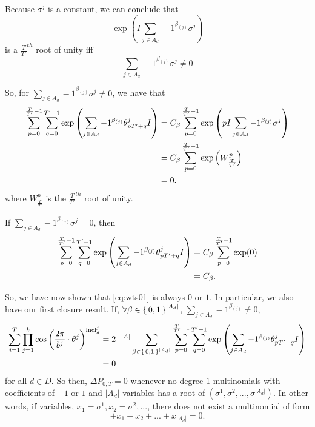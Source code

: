 \documentclass[11pt,titlepage]{article}
\newcommand{\rationalPeriodTotal}{{T}'}
\newcommand{\seedAngle}[1]{{\theta^j_{#1}}}
\newcommand{\totalPeriod}{T}
\newcommand{\inclIndic}[2]{{\mathrm{incl}_{#1}^{#2}}}
\newcommand{\numbToAngle}{\frac{2\pi}{b^j}}
\newcommand{\combSingleTerm}[1]{\prod_{j=1}^k \cos\left(\numbToAngle \cdot \theta^j\right) ^ {\inclIndic{#1}{j}}}
\newcommand{\digSumPeriodic}{\sigma^j}
\newcommand{\digSumPeriodicNoJ}{{\sigma}}
\newcommand{\totalOverRationalFrac}{\frac{\totalPeriod}{\rationalPeriodTotal}}
\begin{document}
Because $\digSumPeriodic$ is a constant, we can conclude that
\begin{equation*}
 \exp\left(
      I \sum_{j \in A_d} -1 ^ {\beta_{(j)}}
      \digSumPeriodic
    \right) 
\end{equation*}
is a $\totalOverRationalFrac^{th}$ root of unity iff 
$$\sum_{j \in A_d} -1 ^ {\beta_{(j)}}\digSumPeriodic \neq 0$$

So, for $\sum_{j \in A_d} -1 ^ {\beta_{(j)}}\digSumPeriodic \neq 0$, we have that
\begin{align*}
  \eqWTSInnerProd &= C_\beta \sum_{p= 0}^{\frac{\totalPeriod}{\rationalPeriodTotal} - 1}
    \exp\left(
      pI \sum_{j \in A_d} -1 ^ {\beta_{(j)}}
      \digSumPeriodic
    \right) \\
    &= C_\beta \sum_{p = 0}^{\totalOverRationalFrac - 1}\exp\left(W_{\totalOverRationalFrac}^p\right) \\
    &= 0.
\end{align*}
where $W_{\totalOverRationalFrac}^p$ is the $\totalOverRationalFrac^{th}$ root of unity.

If $\sum_{j \in A_d} -1 ^ {\beta_{(j)}} \digSumPeriodic = 0$, then 
\begin{align*}
  \eqWTSInnerProd &= C_\beta \sum_{p= 0}^{\frac{\totalPeriod}{\rationalPeriodTotal} - 1} \exp(0) \\
  &= C_\beta.
\end{align*}

So, we have now shown that \eqref{eq:wts01} is always $0$ or $1$. In particular, we also have our first 
closure result. If, $\forall \beta \in \set{0, 1}^{|A_d|}$, $\sum_{j \in A_d} -1 ^ {\beta_{(j)}} \neq 0$,
\begin{align*}
  \sum_{i = 1}^T \combSingleTerm{d} &=  2^{-|A|} 
  \sum_{\beta \in \set{0,1}^{|A_d|}} 
      \sum_{p= 0}^{\frac{\totalPeriod}{\rationalPeriodTotal} - 1} \sum_{q = 0}^{\rationalPeriodTotal - 1}
     \exp\left(
         \sum_{j \in A_d} -1 ^ {\beta_{(j)}}
         \seedAngle{p \rationalPeriodTotal + q}I
       \right) \\
        &= 0
\end{align*}
for all $d \in D$.
So then, $\Delta P_{0, T} = 0$ whenever 
no degree $1$ multinomials with coefficients of $-1$ or $1$ and $|A_d|$ variables has a root of $(\digSumPeriodicNoJ^1, \digSumPeriodicNoJ^2, ..., \digSumPeriodicNoJ^{|A_d|})$.
In other words, if variables, $x_1 = \digSumPeriodicNoJ^1, x_2 = \digSumPeriodicNoJ^2, ...$, there does not exist a multinomial
of form 
$$
  \pm x_1 \pm x_2 \pm ... \pm x_{|A_d|} = 0.
$$
\end{document}

